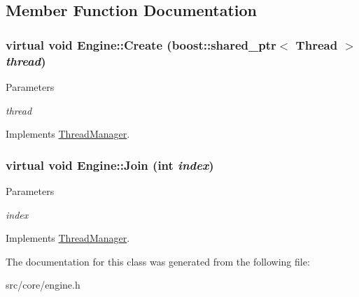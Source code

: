 \subsection{Member Function Documentation}
\hypertarget{classEngine_a5de6694a069170d2205599331e6e8691}{
\subsubsection[{Create}]{\setlength{\rightskip}{0pt plus 5cm}virtual void Engine::Create (boost::shared\_\-ptr$<$ Thread $>$ {\em thread})}}
\label{d1/db6/classEngine_a5de6694a069170d2205599331e6e8691}

\begin{DoxyParams}{Parameters}
\item[{\em thread}]\end{DoxyParams}


Implements \hyperlink{classThreadManager_afad6766592d98c6c0a2129f45e6a346e}{ThreadManager}.

\hypertarget{classEngine_afe5c1c859cfe9b121627156dfbd58e6b}{
\subsubsection[{Join}]{\setlength{\rightskip}{0pt plus 5cm}virtual void Engine::Join (int {\em index})}}
\label{d1/db6/classEngine_afe5c1c859cfe9b121627156dfbd58e6b}

\begin{DoxyParams}{Parameters}
\item[{\em index}]\end{DoxyParams}


Implements \hyperlink{classThreadManager_a3c1b72b44ca4ffa3652088d44937b9d0}{ThreadManager}.



The documentation for this class was generated from the following file:\begin{DoxyCompactItemize}
\item 
src/core/engine.h\end{DoxyCompactItemize}
